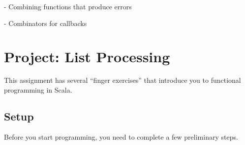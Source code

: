 \documentclass[9pt]{extbook}
\begin{document}
- Combining functions that produce errors

- Combinators for callbacks























































\chapter{Project: List Processing}

This assignment has several ``finger exercises'' that introduce you
to functional programming in Scala.

\section{Setup}

Before you start programming, you need to complete a few preliminary steps.
\end{document}

